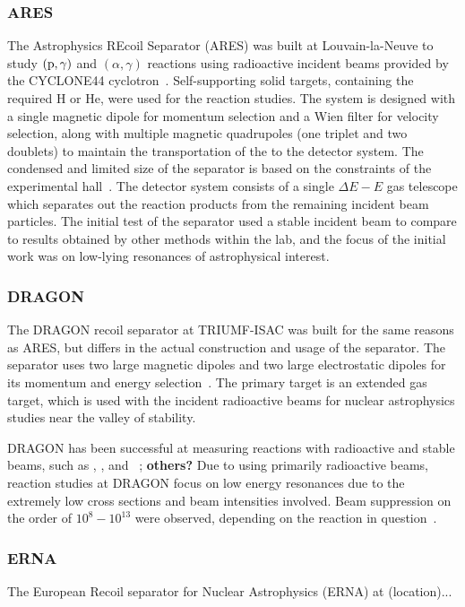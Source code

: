\subsubsection{ARES}
The Astrophysics REcoil Separator (ARES) was built at Louvain-la-Neuve to
study $(\rm{p},\gamma)$ and $(\alpha,\gamma)$ reactions using radioactive
incident beams provided by the CYCLONE44 cyclotron~\cite{Angulo2001}.
Self-supporting solid targets, containing the required H or He, were used for
the reaction studies. The system is designed with a single magnetic dipole for
momentum selection and a Wien filter for velocity selection, along with
multiple magnetic quadrupoles (one triplet and two doublets) to maintain the
transportation of the to the
detector system. The condensed and limited size of the separator is based on
the constraints of the experimental hall~\cite{Couder2003}. The detector system
consists of a single $\Delta E − E$ gas telescope which separates out the reaction
products from the remaining incident beam particles. The initial test of the
separator used a stable incident beam to compare to results obtained by other
methods within the lab, and the focus of the initial work was on low-lying
resonances of astrophysical interest.

\subsubsection{DRAGON}
The DRAGON recoil separator at TRIUMF-ISAC was built for the same reasons as ARES,
but differs in the actual construction and usage of the separator. The
separator uses two large magnetic dipoles and two large electrostatic dipoles
for its momentum and energy selection~\cite{Engel2005}. The primary target is
an extended gas target, which is used with the incident radioactive beams for
nuclear astrophysics studies near the valley of stability.

DRAGON has been successful at measuring reactions with radioactive and stable
beams, such as ,
, and
~\cite{Engel2005}; \textbf{others?}
Due to using primarily radioactive beams, reaction studies at DRAGON focus on
low energy resonances due to the extremely low cross sections and beam
intensities involved. Beam suppression on the order of $10^{8} - 10^{13}$ were
observed, depending on the reaction in question~\cite{Engel2005}.

\subsubsection{ERNA}
The European Recoil separator for Nuclear Astrophysics (ERNA) at (location)...

